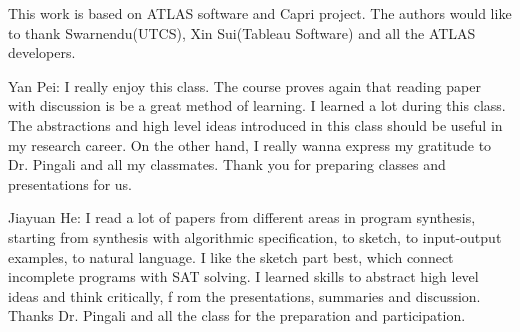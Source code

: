 \documentclass[sigplan,10pt,review]{acmart}\settopmatter{printfolios=true,printccs=false,printacmref=false}
\begin{document}




\maketitle




%







\begin{acks}                            %
  This work is based on ATLAS software and Capri project. The authors would
  like to thank Swarnendu(UTCS), Xin Sui(Tableau Software) and all the ATLAS
  developers.

  Yan Pei: I really enjoy this class. The course proves again that reading
  paper with discussion is be a great method of learning. I learned a lot
  during this class. The abstractions and high level ideas introduced in
  this class should be useful in my research career. On the other hand, I
  really wanna express my gratitude to Dr. Pingali and all my classmates.
  Thank you for preparing classes and presentations for us.

  Jiayuan He: I read a lot of papers from different areas in program synthesis, starting
  from synthesis with algorithmic specification, to sketch, to input-output examples, to
  natural language. I like the sketch part best, which connect incomplete programs
  with SAT solving. I learned skills to abstract high level ideas and think critically, f
  rom the presentations, summaries and discussion. Thanks Dr. Pingali and all the class
  for the preparation and participation.


\end{acks}


\newpage


%





\end{document}
